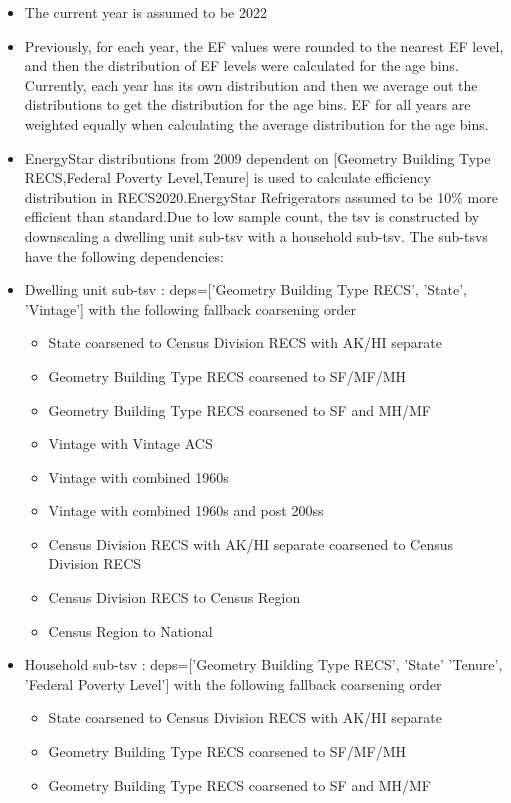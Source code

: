 \begin{itemize}
\item The current year is assumed to be 2022
\item Previously, for each year, the EF values were rounded to the nearest EF level, and then the distribution of EF levels were calculated for the age bins. Currently, each year has its own distribution and then we average out the distributions to get the distribution for the age bins. EF for all years are weighted equally when calculating the average distribution for the age bins.
\item EnergyStar distributions from 2009 dependent on [Geometry Building Type RECS,Federal Poverty Level,Tenure] is used to calculate efficiency distribution in RECS2020.EnergyStar Refrigerators assumed to be 10\% more efficient than standard.Due to low sample count, the tsv is constructed by downscaling a dwelling unit sub-tsv with a household sub-tsv. The sub-tsvs have the following dependencies:
\item Dwelling unit sub-tsv : deps=['Geometry Building Type RECS', 'State', 'Vintage'] with the following fallback coarsening order
  \begin{itemize}
  \item State coarsened to Census Division RECS with AK/HI separate
  \item Geometry Building Type RECS coarsened to SF/MF/MH
  \item Geometry Building Type RECS coarsened to SF and MH/MF
  \item Vintage with Vintage ACS
  \item Vintage with combined 1960s
  \item Vintage with combined 1960s and post 200ss
  \item Census Division RECS with AK/HI separate coarsened to Census Division RECS
  \item Census Division RECS to Census Region
  \item Census Region to National
  \end{itemize}
\item Household sub-tsv : deps=['Geometry Building Type RECS', 'State' 'Tenure', 'Federal Poverty Level'] with the following fallback coarsening order
  \begin{itemize}
  \item State coarsened to Census Division RECS with AK/HI separate
  \item Geometry Building Type RECS coarsened to SF/MF/MH
  \item Geometry Building Type RECS coarsened to SF and MH/MF

\end{itemize}
\end{itemize}
